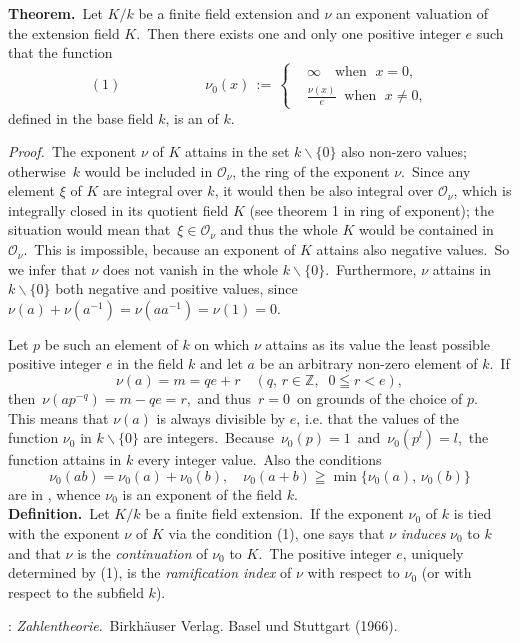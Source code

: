 \documentclass[12pt]{article}
\theoremstyle{definition}
\begin{document}

\textbf{Theorem.}\, Let $K/k$ be a finite field extension and $\nu$ an exponent valuation of the extension field $K$.\, Then there exists one and only one positive integer $e$ such that the function
\[
(1) \qquad\qquad\qquad \nu_0(x)\, := \,  
\begin{cases}
& \infty \quad \mbox{when }\; x = 0,\\
& \frac{\nu(x)}{e} \;\; \mbox{when }\; x \neq 0,
\end{cases} 
\]
defined in the base field $k$, is an  of $k$.

{\em Proof.}\, The exponent $\nu$ of $K$ attains in the set $k\!\smallsetminus\!\{0\}$ also non-zero values; otherwise\, $k$ would be included in $\mathcal{O}_\nu$, the ring of the exponent $\nu$.\, Since any element $\xi$ of $K$ are integral over $k$, it would then be also integral over $\mathcal{O}_\nu$, which is integrally closed in its quotient field $K$ (see theorem 1 in ring of exponent); the situation would mean that\, $\xi \in \mathcal{O}_\nu$ and thus the whole $K$ would be contained in $\mathcal{O}_\nu$.\, This is impossible, because an exponent of $K$ attains also negative values.\, So we infer that $\nu$ does not vanish in the whole $k\!\smallsetminus\!\{0\}$.\, Furthermore, $\nu$ attains in $k\!\smallsetminus\!\{0\}$ both negative and positive values, since\, $\nu(a)\!+\!\nu(a^{-1}) = 
\nu(aa^{-1}) = \nu(1) = 0$.

Let $p$ be such an element of $k$ on which $\nu$ attains as its value the least possible positive integer $e$ in the field $k$ and let $a$ be an arbitrary non-zero element of $k$.\, If 
$$\nu(a) = m = qe+r \quad (q,\,r \in \mathbb{Z},\;\; 0 \leqq r < e),$$
then\, $\nu(ap^{-q}) = m-qe = r$,\, and thus\, $r = 0$\, on grounds of the choice of $p$.\, This means that $\nu(a)$ is always divisible by $e$, i.e. that the values of the function $\nu_0$ in $k\!\smallsetminus\!\{0\}$ are integers.\, Because\, $\nu_0(p) = 1$\, and\, $\nu_0(p^l) = l$,\, the function attains in $k$ every integer value.\, Also the conditions
$$\nu_0(ab) = \nu_0(a)+\nu_0(b), \quad \nu_0(a+b) \geqq \min\{\nu_0(a),\,\nu_0(b)\}$$
are in , whence $\nu_0$ is an exponent of the field $k$.\\


\textbf{Definition.}\, Let $K/k$ be a finite field extension.\, If the exponent $\nu_0$ of $k$ is tied with the exponent $\nu$ of $K$ via the condition (1), one says that $\nu$ {\em induces} $\nu_0$ to $k$ and that $\nu$ is the {\em continuation} of $\nu_0$ to $K$.\, The positive integer $e$, uniquely determined by (1), is the {\em ramification index} of $\nu$ with respect to $\nu_0$ (or with respect to the subfield $k$).

\begin{thebibliography}{9}
: {\em Zahlentheorie}.\, Birkh\"auser Verlag. Basel und Stuttgart (1966).
\end{thebibliography}
\end{document}
